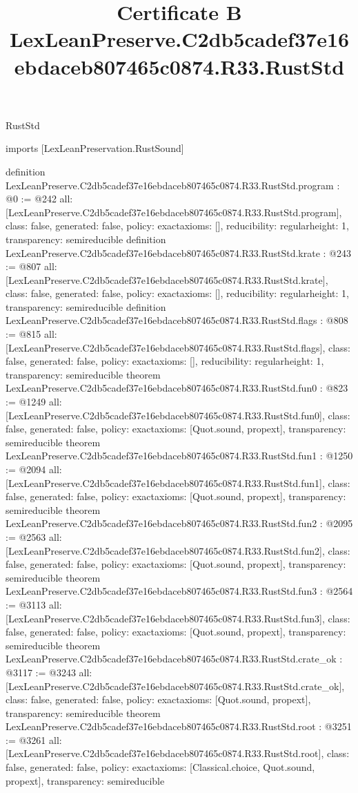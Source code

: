 \begin{lexlean}{RustStd}
\title{Certificate B LexLeanPreserve.C2db5cadef37e16ebdaceb807465c0874.R33.RustStd}
\begin{coremodule}
imports [LexLeanPreservation.RustSound]

definition LexLeanPreserve.C2db5cadef37e16ebdaceb807465c0874.R33.RustStd.program : @0 := @242 {
  all: [LexLeanPreserve.C2db5cadef37e16ebdaceb807465c0874.R33.RustStd.program],
  class: false,
  generated: false,
  policy: exact{axioms: []},
  reducibility: regular{height: 1},
  transparency: semireducible
}
definition LexLeanPreserve.C2db5cadef37e16ebdaceb807465c0874.R33.RustStd.krate : @243 := @807 {
  all: [LexLeanPreserve.C2db5cadef37e16ebdaceb807465c0874.R33.RustStd.krate],
  class: false,
  generated: false,
  policy: exact{axioms: []},
  reducibility: regular{height: 1},
  transparency: semireducible
}
definition LexLeanPreserve.C2db5cadef37e16ebdaceb807465c0874.R33.RustStd.flags : @808 := @815 {
  all: [LexLeanPreserve.C2db5cadef37e16ebdaceb807465c0874.R33.RustStd.flags],
  class: false,
  generated: false,
  policy: exact{axioms: []},
  reducibility: regular{height: 1},
  transparency: semireducible
}
theorem LexLeanPreserve.C2db5cadef37e16ebdaceb807465c0874.R33.RustStd.fun0 : @823 := @1249 {
  all: [LexLeanPreserve.C2db5cadef37e16ebdaceb807465c0874.R33.RustStd.fun0],
  class: false,
  generated: false,
  policy: exact{axioms: [Quot.sound, propext]},
  transparency: semireducible
}
theorem LexLeanPreserve.C2db5cadef37e16ebdaceb807465c0874.R33.RustStd.fun1 : @1250 := @2094 {
  all: [LexLeanPreserve.C2db5cadef37e16ebdaceb807465c0874.R33.RustStd.fun1],
  class: false,
  generated: false,
  policy: exact{axioms: [Quot.sound, propext]},
  transparency: semireducible
}
theorem LexLeanPreserve.C2db5cadef37e16ebdaceb807465c0874.R33.RustStd.fun2 : @2095 := @2563 {
  all: [LexLeanPreserve.C2db5cadef37e16ebdaceb807465c0874.R33.RustStd.fun2],
  class: false,
  generated: false,
  policy: exact{axioms: [Quot.sound, propext]},
  transparency: semireducible
}
theorem LexLeanPreserve.C2db5cadef37e16ebdaceb807465c0874.R33.RustStd.fun3 : @2564 := @3113 {
  all: [LexLeanPreserve.C2db5cadef37e16ebdaceb807465c0874.R33.RustStd.fun3],
  class: false,
  generated: false,
  policy: exact{axioms: [Quot.sound, propext]},
  transparency: semireducible
}
theorem LexLeanPreserve.C2db5cadef37e16ebdaceb807465c0874.R33.RustStd.crate_ok : @3117 := @3243 {
  all: [LexLeanPreserve.C2db5cadef37e16ebdaceb807465c0874.R33.RustStd.crate_ok],
  class: false,
  generated: false,
  policy: exact{axioms: [Quot.sound, propext]},
  transparency: semireducible
}
theorem LexLeanPreserve.C2db5cadef37e16ebdaceb807465c0874.R33.RustStd.root : @3251 := @3261 {
  all: [LexLeanPreserve.C2db5cadef37e16ebdaceb807465c0874.R33.RustStd.root],
  class: false,
  generated: false,
  policy: exact{axioms: [Classical.choice, Quot.sound, propext]},
  transparency: semireducible
}


\end{coremodule}
\end{lexlean}
